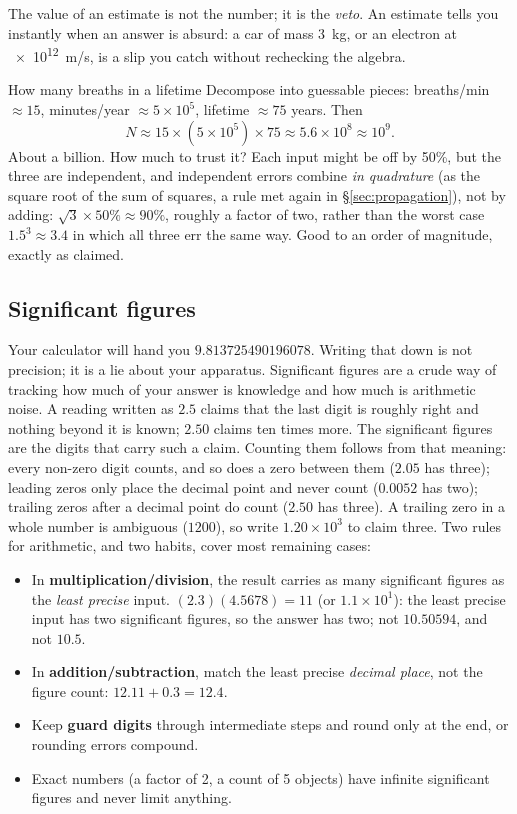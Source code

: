 The value of an estimate is not the number; it is the \emph{veto}. An estimate tells you instantly when
an answer is absurd: a car of mass \SI{3}{kg}, or an electron at \SI{e12}{m/s}, is a slip you catch
without rechecking the algebra.

\begin{exbox}{How many breaths in a lifetime}
Decompose into guessable pieces: breaths/min $\approx15$, minutes/year $\approx5\times10^5$, lifetime
$\approx75$ years. Then
\[
N\approx 15\times(5\times10^5)\times75\approx5.6\times10^8\approx10^9.
\]
About a billion. How much to trust it? Each input might be off by 50\%, but the three are independent,
and independent errors combine \emph{in quadrature} (as the square root of the sum of squares, a rule
met again in \S\ref{sec:propagation}), not by adding: $\sqrt3\times50\%\approx90\%$,
roughly a factor of two, rather than the worst case $1.5^{3}\approx3.4$ in which all three err the same
way. Good to an order of magnitude, exactly as claimed. 
\end{exbox}

\subsection{Significant figures}

Your calculator will hand you $9.813725490196078$. Writing that down is not precision; it is a lie about
your apparatus. Significant figures are a crude way of tracking how much of your answer is knowledge and
how much is arithmetic noise. A reading written as $2.5$ claims that the last digit is roughly
right and nothing beyond it is known; $2.50$ claims ten times more. The significant figures are the
digits that carry such a claim. Counting them follows from that meaning: every non-zero digit counts,
and so does a zero between them ($2.05$ has three); leading zeros only place the decimal point and never
count ($0.0052$ has two); trailing zeros after a decimal point do count ($2.50$ has three). A trailing
zero in a whole number is ambiguous ($1200$), so write $1.20\times10^{3}$ to claim three. Two rules for
arithmetic, and two habits, cover most remaining cases:

\begin{itemize}
\item In \textbf{multiplication/division}, the result carries as many significant figures as the
\emph{least precise} input. $(2.3)(4.5678)=11$ (or $1.1\times10^{1}$): the least precise input has two significant figures, so
the answer has two; not $10.50594$, and not $10.5$.
\item In \textbf{addition/subtraction}, match the least precise \emph{decimal place}, not the figure
count: $12.11+0.3=12.4$.
\item Keep \textbf{guard digits} through intermediate steps and round only at the end, or rounding errors
compound.
\item Exact numbers (a factor of 2, a count of 5 objects) have infinite significant figures and
never limit anything.
\end{itemize}

